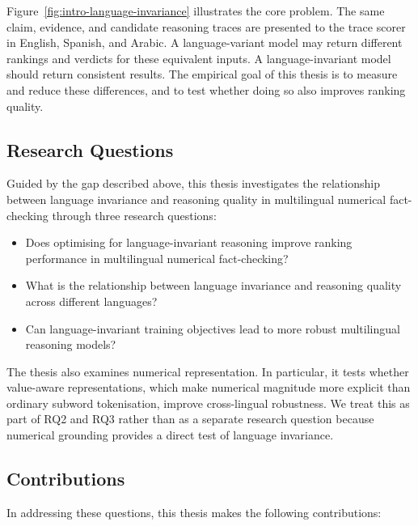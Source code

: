 Figure~\ref{fig:intro-language-invariance} illustrates the core problem. The same claim, evidence,
and candidate reasoning traces are presented to the trace scorer in English, Spanish, and Arabic. A
language-variant model may return different rankings and verdicts for these equivalent inputs. A
language-invariant model should return consistent results. The empirical goal of this thesis is to
measure and reduce these differences, and to test whether doing so also improves ranking quality.

\subsection{Research Questions}
\label{sec:rqs}

Guided by the gap described above, this thesis investigates the relationship between language
invariance and reasoning quality in multilingual numerical fact-checking through three research
questions:

\begin{itemize}
    \item[\textbf{RQ1}] Does optimising for language-invariant reasoning improve ranking performance
    in multilingual numerical fact-checking?
    \item[\textbf{RQ2}] What is the relationship between language invariance and reasoning quality
    across different languages?
    \item[\textbf{RQ3}] Can language-invariant training objectives lead to more robust multilingual
    reasoning models?
\end{itemize}

\noindent
The thesis also examines numerical representation. In particular, it tests whether value-aware
representations, which make numerical magnitude more explicit than ordinary subword tokenisation,
improve cross-lingual robustness. We treat this as part of RQ2 and RQ3 rather than as a separate
research question because numerical grounding provides a direct test of language invariance.

\subsection{Contributions}
\label{sec:contributions}

In addressing these questions, this thesis makes the following contributions:

